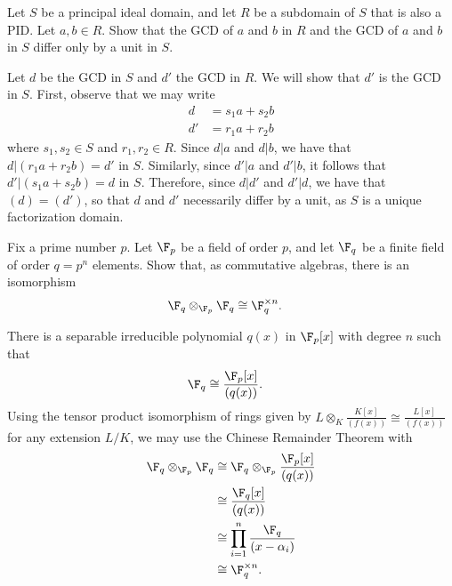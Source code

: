 \documentclass[10pt]{mypackage}
\begin{document}
\begin{problem}[Problem 3]
  Let $S$ be a principal ideal domain, and let $R$ be a subdomain of $S$ that is also a PID. Let $a,b\in R$. Show that the GCD of $a$ and $b$ in $R$ and the GCD of $a$ and $b$ in $S$ differ only by a unit in $S$.
\end{problem}
\begin{solution}
  Let $d$ be the GCD in $S$ and $d'$ the GCD in $R$. We will show that $d'$ is the GCD in $S$. First, observe that we may write
  \begin{align*}
    d &= s_1a + s_2b\\
    d' &= r_1a + r_2 b
  \end{align*}
  where $s_1,s_2\in S$ and $r_1,r_2\in R$. Since $d | a$ and $d | b$, we have that $d | \left( r_1a + r_2b \right) = d'$ in $S$. Similarly, since $d' | a$ and $d' | b$, it follows that $d' | \left( s_1a + s_2b \right) = d$ in $S$. Therefore, since $d | d'$ and $d' | d$, we have that $\left( d \right) = \left( d' \right)$, so that $d$ and $d'$ necessarily differ by a unit, as $S$ is a unique factorization domain.
\end{solution}
\begin{problem}[Problem 4]
  Fix a prime number $p$. Let $\F_p$ be a field of order $p$, and let $\F_q$ be a finite field of order $q = p^{n}$ elements. Show that, as commutative algebras, there is an isomorphism
  \begin{align*}
    \F_q\otimes_{\F_p}\F_q &\cong \F_q^{\times n}.
  \end{align*}
\end{problem}
\begin{solution}
  There is a separable irreducible polynomial $q(x)$ in $\F_p[x]$ with degree $n$ such that
  \begin{align*}
    \F_q &\cong \frac{\F_p[x]}{\left( q(x) \right)}.
  \end{align*}
  Using the tensor product isomorphism of rings given by $L\otimes_{K}\frac{K[x]}{\left( f(x) \right)}\cong \frac{L[x]}{\left( f(x) \right)}$ for any extension $L/K$, we may use the Chinese Remainder Theorem with
  \begin{align*}
    \F_q\otimes_{\F_p}\F_q &\cong \F_q\otimes_{\F_p}\frac{\F_p[x]}{\left( q(x) \right)}\\
                           &\cong \frac{\F_q[x]}{\left( q(x) \right)}\\
                           &\cong \prod_{i=1}^{n} \frac{\F_q}{\left( x-\alpha_i \right)}\\
                           &\cong \F_q^{\times n}.
  \end{align*}
\end{solution}
\end{document}
